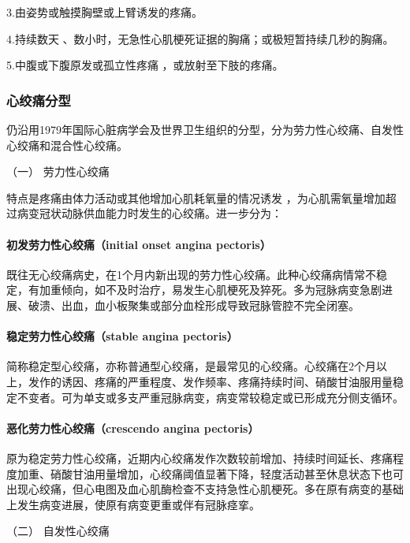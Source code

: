 3.由姿势或触摸胸壁或上臂诱发的疼痛。

4.持续数天 、数小时，无急性心肌梗死证据的胸痛；或极短暂持续几秒的胸痛。

5.中腹或下腹原发或孤立性疼痛 ，或放射至下肢的疼痛。

\subsubsection{心绞痛分型}

仍沿用1979年国际心脏病学会及世界卫生组织的分型，分为劳力性心绞痛、自发性心绞痛和混合性心绞痛。

\hypertarget{text00309.htmlux5cux23CHP10-7-2-4-1}{}
（一） 劳力性心绞痛

特点是疼痛由体力活动或其他增加心肌耗氧量的情况诱发
，为心肌需氧量增加超过病变冠状动脉供血能力时发生的心绞痛。进一步分为：

\paragraph{初发劳力性心绞痛（initial onset angina pectoris）}

既往无心绞痛病史，在1个月内新出现的劳力性心绞痛。此种心绞痛病情常不稳定，有加重倾向，如不及时治疗，易发生心肌梗死及猝死。多为冠脉病变急剧进展、破溃、出血，血小板聚集或部分血栓形成导致冠脉管腔不完全闭塞。

\paragraph{稳定劳力性心绞痛（stable angina pectoris）}

简称稳定型心绞痛，亦称普通型心绞痛，是最常见的心绞痛。心绞痛在2个月以上，发作的诱因、疼痛的严重程度、发作频率、疼痛持续时间、硝酸甘油服用量稳定不变者。可为单支或多支严重冠脉病变，病变常较稳定或已形成充分侧支循环。

\paragraph{恶化劳力性心绞痛（crescendo angina pectoris）}

原为稳定劳力性心绞痛，近期内心绞痛发作次数较前增加、持续时间延长、疼痛程度加重、硝酸甘油用量增加，心绞痛阈值显著下降，轻度活动甚至休息状态下也可出现心绞痛，但心电图及血心肌酶检查不支持急性心肌梗死。多在原有病变的基础上发生病变进展，使原有病变更重或伴有冠脉痉挛。

\hypertarget{text00309.htmlux5cux23CHP10-7-2-4-2}{}
（二） 自发性心绞痛


